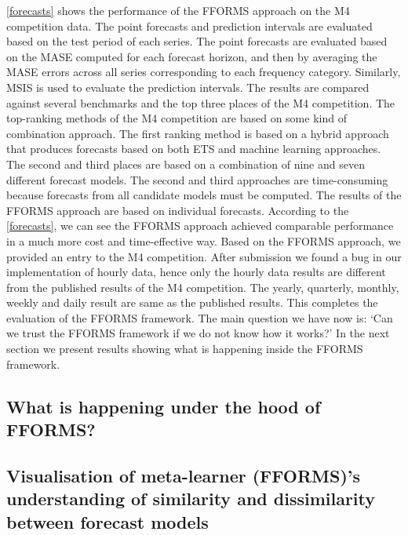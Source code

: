 \documentclass[11pt,a4paper,]{article}
\begin{document}
\autoref{forecasts} shows the performance of the FFORMS approach on the M4 competition data. The point forecasts and prediction intervals are evaluated based on the test period of each series. The point forecasts are evaluated based on the MASE computed for each forecast horizon, and then by averaging the MASE errors across all series corresponding to each frequency category. Similarly, MSIS is used to evaluate the prediction intervals. The results are compared against several benchmarks and the top three places of the M4 competition. The top-ranking methods of the M4 competition are based on some kind of combination approach. The first ranking method is based on a hybrid approach that produces forecasts based on both ETS and machine learning approaches. The second and third places are based on a combination of nine and seven different forecast models. The second and third approaches are time-consuming because forecasts from all candidate models must be computed. The results of the FFORMS approach are based on individual forecasts. According to the \autoref{forecasts}, we can see the FFORMS approach achieved comparable performance in a much more cost and time-effective way. Based on the FFORMS approach, we provided an entry to the M4 competition. After submission we found a bug in our implementation of hourly data, hence only the hourly data results are different from the published results of the M4 competition. The yearly, quarterly, monthly, weekly and daily result are same as the published results. This completes the evaluation of the FFORMS framework. The main question we have now is: `Can we trust the FFORMS framework if we do not know how it works?' In the next section we present results showing what is happening inside the FFORMS framework.

\hypertarget{what-is-happening-under-the-hood-of-fforms}{%
\subsection{What is happening under the hood of FFORMS?}\label{what-is-happening-under-the-hood-of-fforms}}

\hypertarget{visualisation-of-meta-learner-fformss-understanding-of-similarity-and-dissimilarity-between-forecast-models}{%
\subsection{Visualisation of meta-learner (FFORMS)'s understanding of similarity and dissimilarity between forecast models}\label{visualisation-of-meta-learner-fformss-understanding-of-similarity-and-dissimilarity-between-forecast-models}}
\end{document}
